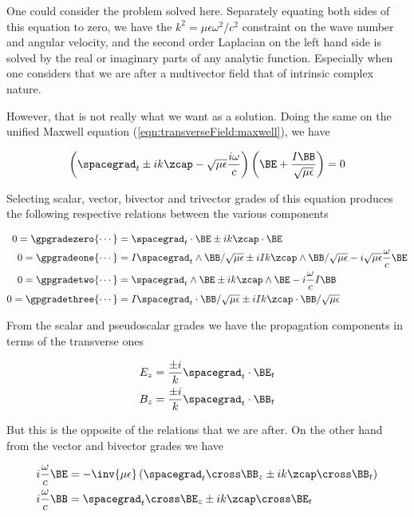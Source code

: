 One could consider the problem solved here.  Separately equating both sides of this equation to zero, we have the $k^2 = \mu\epsilon \omega^2/c^2$ constraint on the wave number and angular velocity, and the second order Laplacian on the left hand side is solved by the real or imaginary parts of any analytic function.  Especially when one considers that we are after a multivector field that of intrinsic complex nature.

However, that is not really what we want as a solution.  Doing the same on the unified Maxwell equation (\ref{eqn:transverseField:maxwell}), we have

\begin{align}\label{eqn:transverseField:max2}
\left(\spacegrad_t \pm i k \zcap - \sqrt{\mu\epsilon}\frac{i\omega}{c}\right) \left(\BE + \frac{I\BB}{\sqrt{\mu\epsilon}} \right) = 0
\end{align}

Selecting scalar, vector, bivector and trivector grades of this equation produces the following respective relations between the various components

\begin{align}\label{eqn:transverseField:blah6}
0 = \gpgradezero{\cdots} &= \spacegrad_t \cdot \BE \pm i k \zcap \cdot \BE \\
0 = \gpgradeone{\cdots} &= I \spacegrad_t \wedge \BB/\sqrt{\mu\epsilon} \pm i I k \zcap \wedge \BB/\sqrt{\mu\epsilon} - i \sqrt{\mu\epsilon}\frac{\omega}{c} \BE \\
0 = \gpgradetwo{\cdots} &= \spacegrad_t \wedge \BE \pm i k \zcap \wedge \BE - i \frac{\omega}{c} I \BB \\
0 = \gpgradethree{\cdots} &= I \spacegrad_t \cdot \BB/\sqrt{\mu\epsilon} \pm i I k \zcap \cdot \BB/\sqrt{\mu\epsilon}
\end{align}

From the scalar and pseudoscalar grades we have the propagation components in terms of the transverse ones

\begin{align}\label{eqn:transverseField:blah7}
E_z &= \frac{\pm i}{k} \spacegrad_t \cdot \BE_t \\
B_z &= \frac{\pm i}{k} \spacegrad_t \cdot \BB_t 
\end{align}

But this is the opposite of the relations that we are after.  On the other hand from the vector and bivector grades we have

\begin{align}\label{eqn:transverseField:messy}
i \frac{\omega}{c} \BE &= -\inv{\mu\epsilon}\left(\spacegrad_t \cross \BB_z \pm i k \zcap \cross \BB_t\right) \\
i \frac{\omega}{c} \BB &= \spacegrad_t \cross \BE_z \pm i k \zcap \cross \BE_t
\end{align}

